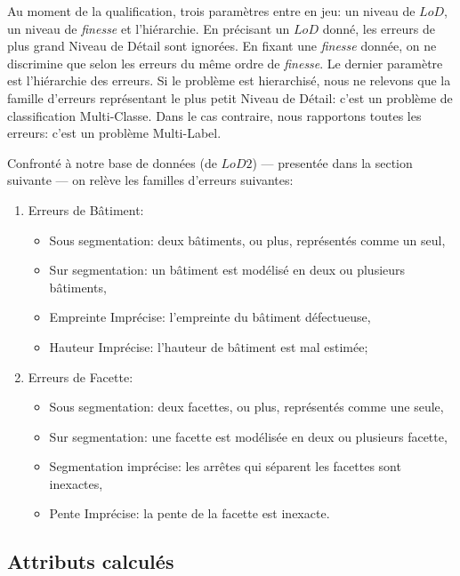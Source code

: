 \documentclass[a4paper,french]{article}
\begin{document}
    Au moment de la qualification, trois paramètres entre en jeu: un niveau de $LoD$, un niveau de \emph{finesse} et l'hiérarchie. En précisant un $LoD$ donné, les erreurs de plus grand Niveau de Détail sont ignorées. En fixant une \emph{finesse} donnée, on ne discrimine que selon les erreurs du même ordre de \emph{finesse}. Le dernier paramètre est l'hiérarchie des erreurs. Si le problème est hierarchisé, nous ne relevons que la famille d'erreurs représentant le plus petit Niveau de Détail: c'est un problème de classification Multi-Classe. Dans le cas contraire, nous rapportons toutes les erreurs: c'est un problème Multi-Label.

    Confronté à notre base de données (de $LoD 2$) --- presentée dans la section suivante --- on relève les familles d'erreurs suivantes:

    \begin{enumerate}[label= (\roman*)., itemsep=0pt]
        \item Erreurs de Bâtiment:
        \begin{itemize}[itemsep=0pt]
            \item Sous segmentation: deux bâtiments, ou plus, représentés comme un seul,
            \item Sur segmentation: un bâtiment est modélisé en deux ou plusieurs bâtiments,
            \item Empreinte Imprécise: l'empreinte du bâtiment défectueuse,
            \item Hauteur Imprécise: l'hauteur de bâtiment est mal estimée;
        \end{itemize}
        \item Erreurs de Facette:
        \begin{itemize}[itemsep=0pt]
            \item Sous segmentation: deux facettes, ou plus, représentés comme une seule,
            \item Sur segmentation: une facette est modélisée en deux ou plusieurs facette,
            \item Segmentation imprécise: les arrêtes qui séparent les facettes sont inexactes,
            \item Pente Imprécise: la pente de la facette est inexacte.
        \end{itemize}
    \end{enumerate}

    \subsection{Attributs calculés}
\end{document}
